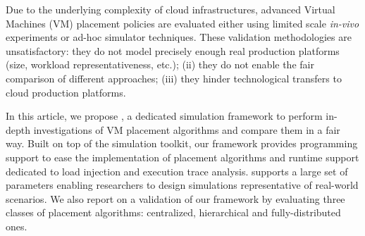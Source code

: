 

 Due to the underlying complexity of cloud infrastructures, advanced
 Virtual Machines (VM) placement policies are evaluated either using limited scale \emph{in-vivo}
experiments or ad-hoc simulator techniques. These validation
methodologies are unsatisfactory:
they do not model precisely enough real production platforms (size,
workload representativeness, etc.); (ii) they do not enable the
fair comparison of different approaches; (iii) they hinder
technological transfers to cloud production platforms.

In this article, we propose \vmps, a dedicated simulation framework to
perform in-depth investigations of VM placement algorithms and compare
them in a fair way. Built on top of the \sg simulation toolkit, our
framework provides programming support to ease the implementation of
placement algorithms and runtime support dedicated to load injection
and execution trace analysis.
\vmps supports a large set of parameters enabling researchers to design simulations representative of
real-world scenarios.
We also report on a validation
of our framework by evaluating three classes of placement algorithms:
centralized, hierarchical and fully-distributed ones.
